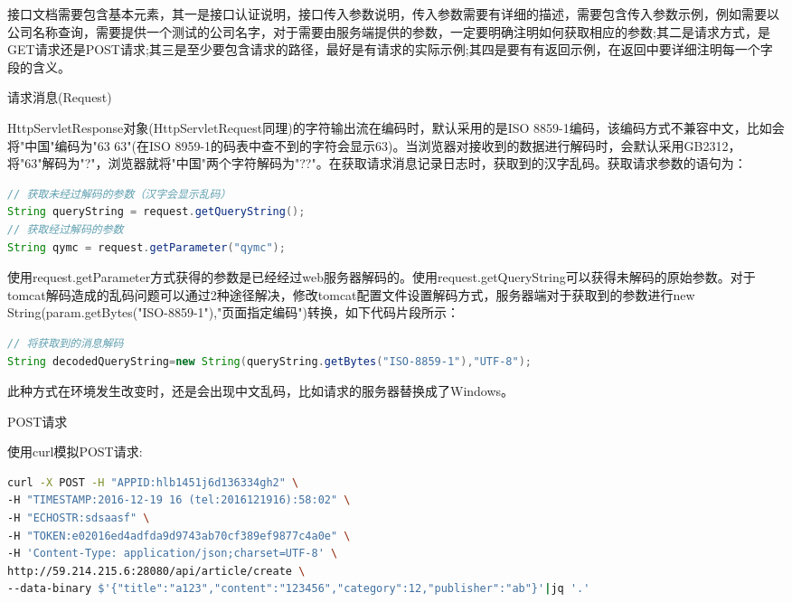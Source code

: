 \documentclass[12pt]{book}
\makeatletter
\numberwithin{dummy}{section}
\theoremstyle{ocrenumbox}
\theoremstyle{blacknumex}
\theoremstyle{blacknumbox}
\theoremstyle{ocrenum}
\renewcommand{\subsection}{\@startsection {subsection}{2}{\z@}
	{-3ex \@plus -0.1ex \@minus -.4ex}
	{0.5ex \@plus.2ex }
	{\normalfont\sffamily\bfseries}}
\renewcommand\paragraph{\@startsection{paragraph}{4}{\z@}
	{-2ex \@plus-.2ex \@minus .2ex}
	{.1ex}
	{\normalfont\small\sffamily\bfseries}}
\newlength\esp
\makeatother
\begin{document}
接口文档需要包含基本元素，其一是接口认证说明，接口传入参数说明，传入参数需要有详细的描述，需要包含传入参数示例，例如需要以公司名称查询，需要提供一个测试的公司名字，对于需要由服务端提供的参数，一定要明确注明如何获取相应的参数;其二是请求方式，是GET请求还是POST请求;其三是至少要包含请求的路径，最好是有请求的实际示例;其四是要有有返回示例，在返回中要详细注明每一个字段的含义。

\subsection{请求消息(Request)}

HttpServletResponse对象(HttpServletRequest同理)的字符输出流在编码时，默认采用的是ISO 8859-1编码，该编码方式不兼容中文，比如会将"中国"编码为"63 63"(在ISO 8959-1的码表中查不到的字符会显示63)。当浏览器对接收到的数据进行解码时，会默认采用GB2312，将"63"解码为"?"，浏览器就将"中国"两个字符解码为"??"。在获取请求消息记录日志时，获取到的汉字乱码。获取请求参数的语句为：

\begin{lstlisting}[language=Java]
// 获取未经过解码的参数（汉字会显示乱码）
String queryString = request.getQueryString();
// 获取经过解码的参数
String qymc = request.getParameter("qymc");
\end{lstlisting}

使用request.getParameter方式获得的参数是已经经过web服务器解码的。使用request.getQueryString可以获得未解码的原始参数。对于tomcat解码造成的乱码问题可以通过2种途径解决，修改tomcat配置文件设置解码方式，服务器端对于获取到的参数进行new String(param.getBytes("ISO-8859-1"),"页面指定编码")转换，如下代码片段所示：

\begin{lstlisting}[language=Java]
// 将获取到的消息解码
String decodedQueryString=new String(queryString.getBytes("ISO-8859-1"),"UTF-8");
\end{lstlisting}

此种方式在环境发生改变时，还是会出现中文乱码，比如请求的服务器替换成了Windows。

\paragraph{POST请求}

使用curl模拟POST请求:

\begin{lstlisting}[language=Bash]
curl -X POST -H "APPID:hlb1451j6d136334gh2" \
-H "TIMESTAMP:2016-12-19 16 (tel:2016121916):58:02" \
-H "ECHOSTR:sdsaasf" \
-H "TOKEN:e02016ed4adfda9d9743ab70cf389ef9877c4a0e" \
-H 'Content-Type: application/json;charset=UTF-8' \
http://59.214.215.6:28080/api/article/create \
--data-binary $'{"title":"a123","content":"123456","category":12,"publisher":"ab"}'|jq '.'
\end{lstlisting}
\end{document}
